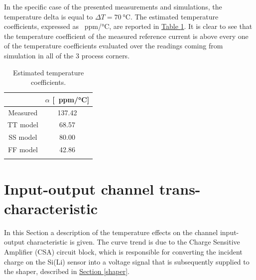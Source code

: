 \noindent
In the specific case of the presented measurements and simulations, the temperature delta is equal to $\Delta T = \SI{70}{\celsius}$. The estimated temperature coefficients, expressed as \SI{}{ppm/\celsius}, are reported in \hyperref[tabtempcoefficients]{Table \ref{tabtempcoefficients}}. It is clear to see that the temperature coefficient of the measured reference current is above every one of the temperature coefficients evaluated over the readings coming from simulation in all of the 3 process corners. %

\begin{table}[ht]
    \centering
    \begin{tabular}{c c} 
        \Xhline{2\arrayrulewidth}
        & $\alpha$ [\SI{}{ppm/\celsius}] \T\B \\
        \hline
        Measured & 137.42 \T\B \\
        TT model & 68.57 \T\B \\
        SS model & 80.00 \T\B \\
        FF model & 42.86 \T\B \\
        \Xhline{2\arrayrulewidth}
    \end{tabular}
    \caption{Estimated temperature coefficients.}
    \label{tabtempcoefficients}
\end{table}



\section{Input-output channel trans-characteristic}
\label{testboardFDT}

In this Section a description of the temperature effects on the channel input-output characteristic is given. The curve trend is due to the Charge Sensitive Amplifier (CSA) circuit block, which is responsible for converting the incident charge on the Si(Li) sensor into a voltage signal that is subsequently supplied to the shaper, described in \hyperref[shaper]{Section \ref{shaper}}. 

